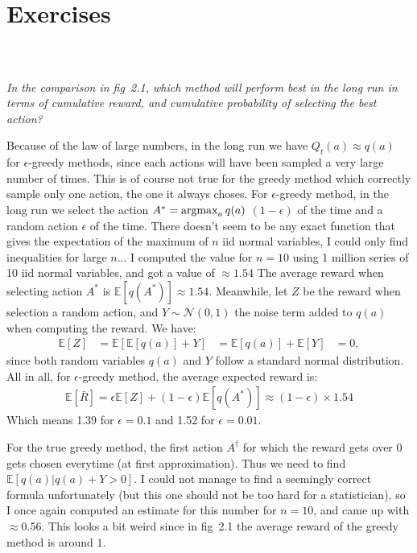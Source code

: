\section{Exercises}

\subsubsection{~}

\textit{In the comparison in fig~2.1, which method will perform best in the long run in terms of cumulative reward, and cumulative probability of selecting the best action?}

Because of the law of large numbers, in the long run we have $Q_t(a) \approx q(a)$ for $\epsilon$-greedy methods, since each actions will have been sampled a very large number of times.
This is of course not true for the greedy method which correctly sample only one action, the one it always choses.
For $\epsilon$-greedy method, in the long run we select the action $A^* = \operatorname*{argmax}_a q(a)$ $(1 - \epsilon)$ of the time and a random action $\epsilon$ of the time.
There doesn't seem to be any exact function that gives the expectation of the maximum of $n$ iid normal variables, I could only find inequalities for large $n$...
I computed the value for $n = 10$ using 1 million series of 10 iid normal variables, and got a value of $\approx 1.54$
The average reward when selecting action $A^*$ is $\mathbb{E}[q(A^*)] \approx 1.54$.
Meanwhile, let $Z$ be the reward when selection a random action, and $Y \sim \mathcal{N}(0,1)$ the noise term added to $q(a)$ when computing the reward.
We have:
\begin{align*}
\mathbb{E}[Z] &= \mathbb{E}[\mathbb{E}[q(a)] + Y]
              &= \mathbb{E}[q(a)] + \mathbb{E}[Y]
              &= 0,
\end{align*}
since both random variables $q(a)$ and $Y$ follow a standard normal distribution.
All in all, for $\epsilon$-greedy method, the average expected reward is:
\begin{align*}
\mathbb{E}[\bar{R}] = \epsilon \mathbb{E}[Z] + (1 - \epsilon) \mathbb{E}[q(A^*)]
                    \approx (1 - \epsilon) \times 1.54
\end{align*}
Which means 1.39 for $\epsilon = 0.1$ and 1.52 for $\epsilon = 0.01$.

For the true greedy method, the first action $A^\dagger$ for which the reward gets over 0 gets chosen everytime (at first approximation).
Thus we need to find $\mathbb{E}[q(a)| q(a) + Y > 0]$.
I could not manage to find a seemingly correct formula unfortunately (but this one should not be too hard for a statistician), so I once again computed an estimate for this number for $n = 10$, and came up with $\approx 0.56$.
This looks a bit weird since in fig~2.1 the average reward of the greedy method is around $1$.
